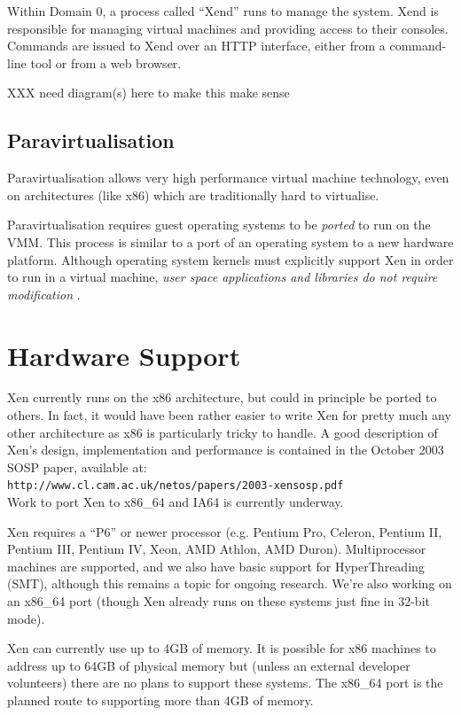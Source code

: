 \documentclass[11pt,twoside,final,openright]{xenstyle}
\begin{document}
Within Domain 0, a process called ``Xend'' runs to manage the system.
Xend is responsible for managing virtual machines and providing access
to their consoles.  Commands are issued to Xend over an HTTP
interface, either from a command-line tool or from a web browser.

XXX need diagram(s) here to make this make sense

\subsection{Paravirtualisation}

Paravirtualisation allows very high performance virtual machine
technology, even on architectures (like x86) which are traditionally
hard to virtualise.

Paravirtualisation requires guest operating systems to be { \em ported
} to run on the VMM.  This process is similar to a port of an
operating system to a new hardware platform.  Although operating
system kernels must explicitly support Xen in order to run in a
virtual machine, { \em user space applications and libraries
do not require modification }.

\section{Hardware Support}

Xen currently runs on the x86 architecture, but could in principle be
ported to others. In fact, it would have been rather easier to write
Xen for pretty much any other architecture as x86 is particularly
tricky to handle. A good description of Xen's design, implementation
and performance is contained in the October 2003 SOSP paper, available
at:\\
{\tt http://www.cl.cam.ac.uk/netos/papers/2003-xensosp.pdf}\\
Work to port Xen to x86\_64 and IA64 is currently underway.

Xen requires a ``P6'' or newer processor (e.g. Pentium Pro, Celeron,
Pentium II, Pentium III, Pentium IV, Xeon, AMD Athlon, AMD Duron).
Multiprocessor machines are supported, and we also have basic support
for HyperThreading (SMT), although this remains a topic for ongoing
research.  We're also working on an x86\_64 port (though Xen already
runs on these systems just fine in 32-bit mode).

Xen can currently use up to 4GB of memory.  It is possible for x86
machines to address up to 64GB of physical memory but (unless an
external developer volunteers) there are no plans to support these
systems.  The x86\_64 port is the planned route to supporting more
than 4GB of memory.
\end{document}
